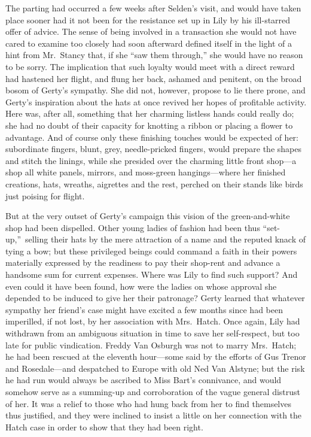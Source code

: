 \documentclass[12pt,a4paper]{book}
\begin{document}
The parting had occurred a few weeks after Selden's visit, and
would have taken place sooner had it not been for the resistance
set up in Lily by his ill-starred offer of advice. The sense of
being involved in a transaction she would not have cared to
examine too closely had soon afterward defined itself in the
light of a hint from Mr.\ Stancy that, if she ``saw them through,''
she would have no reason to be sorry. The implication that such
loyalty would meet with a direct reward had hastened her flight,
and flung her back, ashamed and penitent, on the broad bosom of
Gerty's sympathy. She did not, however, propose to lie there
prone, and Gerty's inspiration about the hats at once revived her
hopes of profitable activity. Here was, after all, something that
her charming listless hands could really do; she had no doubt of
their capacity for knotting a ribbon or placing a flower to
advantage. And of course only these finishing touches would be
expected of her: subordinate fingers, blunt, grey, needle-pricked
fingers, would prepare the shapes and stitch the linings, while
she presided over the charming little front shop---a shop all white
panels, mirrors, and moss-green hangings---where her finished
creations, hats, wreaths, aigrettes and the rest, perched on their
stands like birds just poising for flight.





But at the very outset of Gerty's campaign this vision of the
green-and-white shop had been dispelled. Other young ladies of
fashion had been thus ``set-up,''\ selling their hats by the mere
attraction of a name and the reputed knack of tying a bow; but
these privileged beings could command a faith in their powers
materially expressed by the readiness to pay their shop-rent and
advance a handsome sum for current expenses. Where was Lily to
find such support? And even could it have been found, how were
the ladies on whose approval she depended to be induced to give
her their patronage? Gerty learned that whatever sympathy her
friend's case might have excited a few months since had been
imperilled, if not lost, by her association with Mrs.\ Hatch. Once
again, Lily had withdrawn from an ambiguous situation in time to
save her self-respect, but too late for public vindication. 
Freddy Van Osburgh was not to marry Mrs.\ Hatch; he had been
rescued at the eleventh hour---some said by the efforts of Gus
Trenor and Rosedale---and despatched to Europe with old Ned Van
Alstyne; but the risk he had run would always be ascribed to Miss
Bart's connivance, and would somehow serve as a summing-up and
corroboration of the vague general distrust of her. It was a
relief to those who had hung back from her to find themselves
thus justified, and they were inclined to insist a little on her
connection with the Hatch case in order to show that they had
been right.
\end{document}
